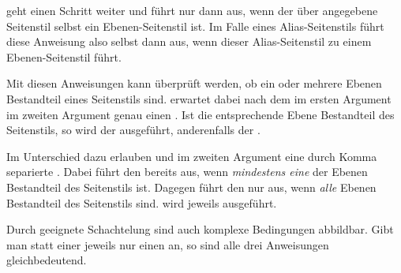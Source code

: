  geht einen Schritt weiter und führt
 nur dann aus, wenn der über 
angegebene Seitenstil selbst ein Ebenen-Seitenstil ist. Im Falle eines
Alias-Seitenstils führt diese Anweisung also selbst dann 
aus, wenn dieser Alias-Seitenstil zu einem Ebenen-Seitenstil führt.%
\EndIndexGroup


\begin{Declaration}
\end{Declaration}
%
%
Mit diesen Anweisungen kann überprüft werden, ob ein oder mehrere Ebenen
Bestandteil eines Seitenstils sind.  erwartet dabei
nach dem  im ersten Argument im zweiten Argument
genau einen . Ist die
entsprechende Ebene Bestandteil des Seitenstils, so wird der 
ausgeführt, anderenfalls der .

Im Unterschied dazu erlauben  und
 im zweiten Argument eine durch Komma separierte
. Dabei führt
 den
 bereits aus, wenn \emph{mindestens eine} der Ebenen
Bestandteil des Seitenstils ist. Dagegen führt
 den  nur
aus, wenn \emph{alle} Ebenen Bestandteil des Seitenstils sind.  wird jeweils 
ausgeführt.

Durch geeignete Schachtelung sind auch komplexe Bedingungen abbildbar. Gibt
man statt einer  jeweils nur einen  an,
so sind alle drei Anweisungen gleichbedeutend.%
\EndIndexGroup


